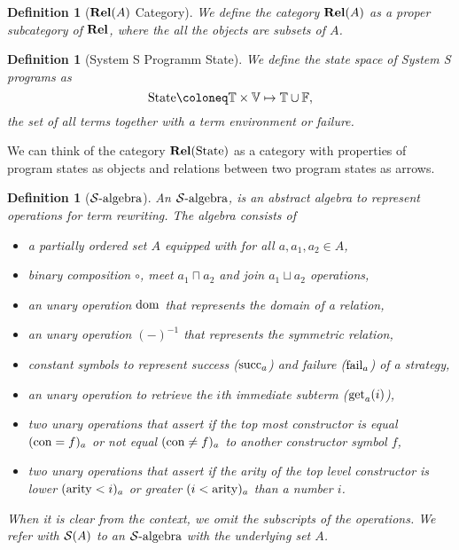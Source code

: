 \documentclass{article}
\newtheorem{definition}[theorem]{Definition}
\newcommand{\Term}{\ensuremath \mathbb{T}}
\newcommand{\Fail}{\ensuremath \mathbb{F}}
\newcommand{\Var}{\ensuremath \mathbb{V}}
\newcommand{\Env}{\ensuremath \Var \mapsto \Term}
\newcommand{\State}{\ensuremath \text{State}}
\newcommand{\Rel}{\ensuremath \mathbf{Rel}}
\newcommand{\Salgebra}{\ensuremath \mathcal{S}\text{-algebra}}
\newcommand{\Salg}{\ensuremath \mathcal{S}}
\newcommand{\domain}{\ensuremath \operatorname{dom}}
\newcommand{\lfail}{\ensuremath \operatorname{fail}}
\newcommand{\lsucc}{\ensuremath \operatorname{succ}}
\newcommand{\get}{\ensuremath \operatorname{get}}
\newcommand{\arity}{\ensuremath \operatorname{arity}}
\newcommand{\constructor}{\ensuremath \operatorname{con}}
\begin{document}
\begin{definition}[$\Rel(A)$ Category] \normalfont
  We define the category $\Rel(A)$ as a proper subcategory of $\Rel$, where the all the objects are subsets of $A$.
\end{definition}

\begin{definition}[System S Programm State] \normalfont
  We define the state space of System S programs as \[\State \coloneq \Term \times \Env \cup \Fail,\] the set of all terms together with a term environment or failure.
\end{definition}

We can think of the category $\Rel(\State)$ as a category with properties of program states as objects and relations between two program states as arrows.

\begin{definition}[$\Salgebra$] \normalfont
  An $\Salgebra$, is an abstract algebra to represent operations for term rewriting. The algebra consists of
  \begin{itemize}
    \item a partially ordered set $A$ equipped with for all $a, a_1, a_2 \in A$,
    \item binary composition $\circ$, \emph{meet} $a_1 \sqcap a_2$ and \emph{join} $a_1 \sqcup a_2$ operations,
    \item an unary operation $\domain$ that represents the domain of a relation,
    \item an unary operation $(-)^{-1}$ that represents the symmetric relation,
    \item constant symbols to represent success ($\lsucc_a$) and failure ($\lfail_a$) of a strategy,
    \item an unary operation to retrieve the $i$th immediate subterm ($\get_a(i)$),
    \item two unary operations that assert if the top most constructor is equal $(\constructor = f)_a$ or not equal $(\constructor \neq f)_a$ to another constructor symbol $f$,
    \item two unary operations that assert if the arity of the top level constructor is lower $(\arity < i)_a$ or greater $(i < \arity)_a$ than a number $i$.
  \end{itemize}
  When it is clear from the context, we omit the subscripts of the operations. We refer with $\Salg(A)$ to an $\Salgebra$ with the underlying set $A$.

  \par\medskip
   

\end{definition}
\end{document}
